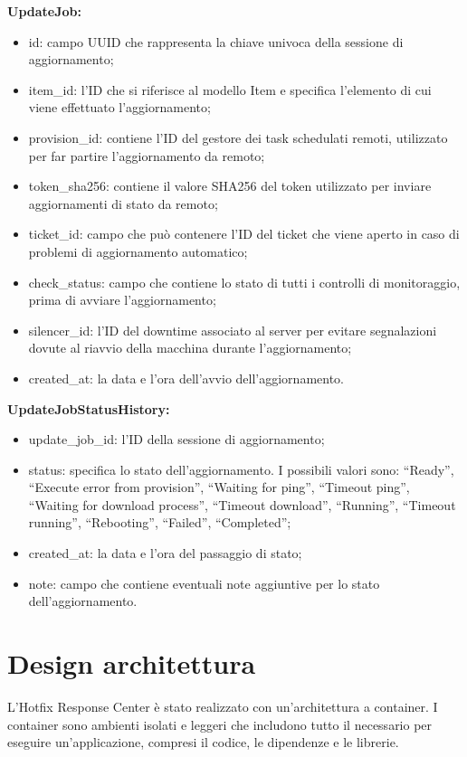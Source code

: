 \noindent \textbf{UpdateJob:}
\begin{itemize}
\item id: campo UUID che rappresenta la chiave univoca della sessione di aggiornamento;
\item item\_id: l'ID che si riferisce al modello Item e specifica l'elemento di cui viene effettuato l'aggiornamento;
\item provision\_id: contiene l'ID del gestore dei task schedulati remoti, utilizzato per far partire l'aggiornamento da remoto;
\item token\_sha256: contiene il valore SHA256 del token utilizzato per inviare aggiornamenti di stato da remoto;
\item ticket\_id: campo che può contenere l'ID del ticket che viene aperto in caso di problemi di aggiornamento automatico;
\item check\_status: campo che contiene lo stato di tutti i controlli di monitoraggio, prima di avviare l'aggiornamento;
\item silencer\_id: l'ID del downtime associato al server per evitare segnalazioni dovute al riavvio della macchina durante l'aggiornamento;
\item created\_at: la data e l'ora dell'avvio dell'aggiornamento.
\end{itemize}

\noindent \textbf{UpdateJobStatusHistory:}
\begin{itemize}
\item update\_job\_id:  l'ID della sessione di aggiornamento;
\item status: specifica lo stato dell'aggiornamento. I possibili valori sono: “Ready”, 
“Execute error from provision”, “Waiting for ping”, “Timeout ping”, 
“Waiting for download process”, “Timeout download”, “Running”, “Timeout running”, “Rebooting”, 
“Failed”, “Completed”;
\item created\_at: la data e l'ora del passaggio di stato;
\item note: campo che contiene eventuali note aggiuntive per lo stato dell'aggiornamento.
\end{itemize}


\section{Design architettura}
L’Hotfix Response Center è stato realizzato con un’architettura a container. 
I container sono ambienti isolati e leggeri che includono tutto il necessario 
per eseguire un'applicazione, compresi il codice, le dipendenze e le librerie.


